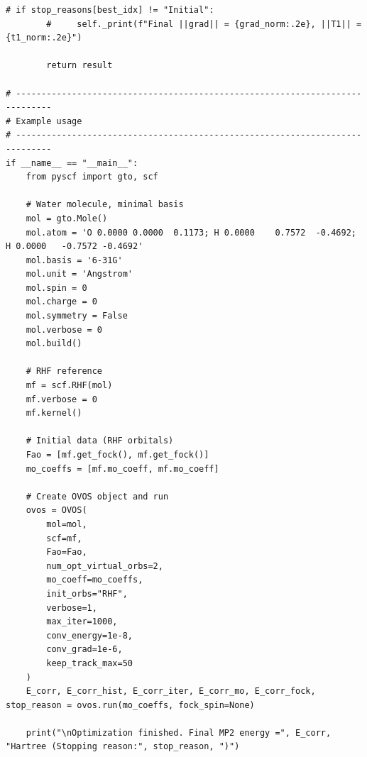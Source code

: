 \begin{lstlisting}[style=python, caption={...}, label=lst:full_code]
        # if stop_reasons[best_idx] != "Initial":
        #     self._print(f"Final ||grad|| = {grad_norm:.2e}, ||T1|| = {t1_norm:.2e}")

        return result

# -----------------------------------------------------------------------------
# Example usage
# -----------------------------------------------------------------------------
if __name__ == "__main__":
    from pyscf import gto, scf

    # Water molecule, minimal basis
    mol = gto.Mole()
    mol.atom = 'O 0.0000 0.0000  0.1173; H 0.0000    0.7572  -0.4692; H 0.0000   -0.7572 -0.4692'
    mol.basis = '6-31G'
    mol.unit = 'Angstrom'
    mol.spin = 0
    mol.charge = 0
    mol.symmetry = False
    mol.verbose = 0
    mol.build()

    # RHF reference
    mf = scf.RHF(mol)
    mf.verbose = 0
    mf.kernel()

    # Initial data (RHF orbitals)
    Fao = [mf.get_fock(), mf.get_fock()]
    mo_coeffs = [mf.mo_coeff, mf.mo_coeff]

    # Create OVOS object and run
    ovos = OVOS(
        mol=mol,
        scf=mf,
        Fao=Fao,
        num_opt_virtual_orbs=2,      
        mo_coeff=mo_coeffs,
        init_orbs="RHF",
        verbose=1,
        max_iter=1000,
        conv_energy=1e-8,
        conv_grad=1e-6,
        keep_track_max=50
    )
    E_corr, E_corr_hist, E_corr_iter, E_corr_mo, E_corr_fock, stop_reason = ovos.run(mo_coeffs, fock_spin=None)

    print("\nOptimization finished. Final MP2 energy =", E_corr, "Hartree (Stopping reason:", stop_reason, ")")
    
\end{lstlisting}

